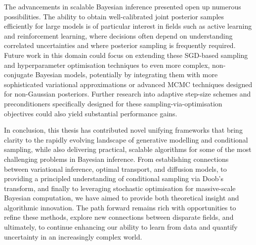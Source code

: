The advancements in scalable Bayesian inference presented open up numerous possibilities. The ability to obtain well-calibrated joint posterior samples efficiently for large models is of particular interest in fields such as active learning and reinforcement learning, where decisions often depend on understanding correlated uncertainties and where posterior sampling is frequently required. Future work in this domain could focus on extending these SGD-based sampling and hyperparameter optimisation techniques to even more complex, non-conjugate Bayesian models, potentially by integrating them with more sophisticated variational approximations or advanced MCMC techniques designed for non-Gaussian posteriors. Further research into adaptive step-size schemes and preconditioners specifically designed for these sampling-via-optimisation objectives could also yield substantial performance gains.

In conclusion, this thesis has contributed novel unifying frameworks that bring clarity to the rapidly evolving landscape of generative modelling and conditional sampling, while also delivering practical, scalable algorithms for some of the most challenging problems in Bayesian inference. From establishing connections between variational inference, optimal transport, and diffusion models, to providing a principled understanding of conditional sampling via Doob's transform, and finally to leveraging stochastic optimisation for massive-scale Bayesian computation, we have aimed to provide both theoretical insight and algorithmic innovation. The path forward remains rich with opportunities to refine these methods, explore new connections between disparate fields, and ultimately, to continue enhancing our ability to learn from data and quantify uncertainty in an increasingly complex world.
